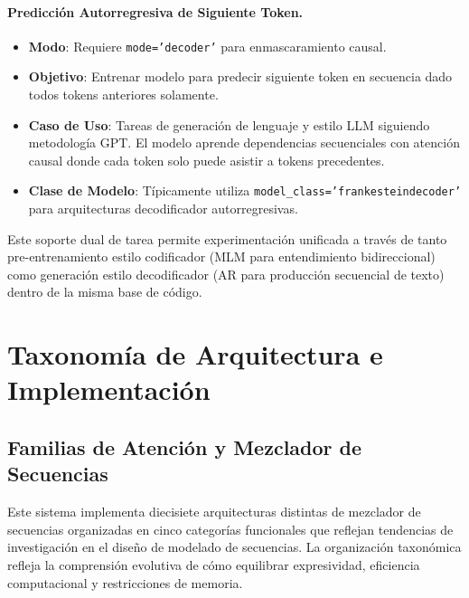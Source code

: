 \documentclass[11pt,a4paper]{article}
\begin{document}
\paragraph{Predicción Autorregresiva de Siguiente Token.}
\begin{itemize}[leftmargin=*]
    \item \textbf{Modo}: Requiere \texttt{mode='decoder'} para enmascaramiento causal.
    \item \textbf{Objetivo}: Entrenar modelo para predecir siguiente token en secuencia dado todos tokens anteriores solamente.
    \item \textbf{Caso de Uso}: Tareas de generación de lenguaje y estilo LLM siguiendo metodología GPT. El modelo aprende dependencias secuenciales con atención causal donde cada token solo puede asistir a tokens precedentes.
    \item \textbf{Clase de Modelo}: Típicamente utiliza \texttt{model\_class='frankesteindecoder'} para arquitecturas decodificador autorregresivas.
\end{itemize}

Este soporte dual de tarea permite experimentación unificada a través de tanto pre-entrenamiento estilo codificador (MLM para entendimiento bidireccional) como generación estilo decodificador (AR para producción secuencial de texto) dentro de la misma base de código.

\section{Taxonomía de Arquitectura e Implementación}
\label{sec:architecture-taxonomy}

\subsection{Familias de Atención y Mezclador de Secuencias}
\label{sec:attention-families}

Este sistema implementa diecisiete arquitecturas distintas de mezclador de secuencias organizadas en cinco categorías funcionales que reflejan tendencias de investigación en el diseño de modelado de secuencias. La organización taxonómica refleja la comprensión evolutiva de cómo equilibrar expresividad, eficiencia computacional y restricciones de memoria.
\end{document}
